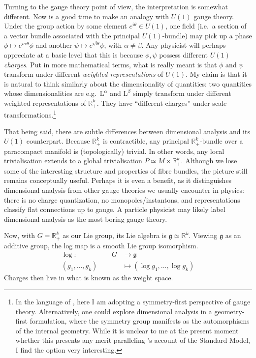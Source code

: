 \documentclass[12pt]{article}
\numberwithin{equation}{section}
\newcommand{\R}{\mathbb{R}}
\begin{document}
\indent Turning to the gauge theory point of view, the interpretation is somewhat different. Now is a good time to make an analogy with $U(1)$ gauge theory. Under the group action by some element $e^{i\theta}\in U(1)$, one field (i.e.~a section of a vector bundle associated with the principal $U(1)$-bundle) may pick up a phase $\phi\mapsto e^{i\alpha\theta}\phi$ and another $\psi\mapsto e^{i\beta\theta}\psi$, with $\alpha\neq \beta$. Any physicist will perhaps appreciate at a basic level that this is because $\phi,\psi$ possess different $U(1)$ \emph{charges}. Put in more mathematical terms, what is really meant is that $\phi$ and $\psi$ transform under different \emph{weighted representations} of $U(1)$. My claim is that it is natural to think similarly about the dimensionality of quantities: two quantities whose dimensionalities are e.g.~$\mathrm{L}^\alpha$ and $\mathrm{L}^\beta$ simply transform under different weighted representations of $\R_+^k$. They have ``different charges'' under scale transformations.\footnote{In the language of \citet{Gomes2024, Gomes2025}, here I am adopting a symmetry-first perspective of gauge theory. Alternatively, one could explore dimensional analysis in a geometry-first formulation, where the symmetry group manifests as the automorphisms of the internal geometry. While it is unclear to me at the present moment whether this presents any merit paralleling \citeauthor{Gomes2024}'s account of the Standard Model, I find the option very interesting.}

That being said, there are subtle differences between dimensional analysis and its $U(1)$ counterpart. Because $\R_+^k$ is contractible, any principal $\R_+^k$-bundle over a paracompact manifold is (topologically) trivial. In other words, any local trivialisation extends to a global trivialisation $P\simeq M\times \R_+^k$. Although we lose some of the interesting structure and properties of fibre bundles, the picture still remains conceptually useful. Perhaps it is even a benefit, as it distinguishes dimensional analysis from other gauge theories we usually encounter in physics: there is no charge quantization, no monopoles/instantons, and representations classify flat connections up to gauge. A particle physicist may likely label dimensional analysis as the most boring gauge theory.

Now, with $G=\R_+^k$ as our Lie group, its Lie algebra is $\mathfrak{g}\simeq \R^k$. Viewing $\mathfrak{g}$ as an additive group, the log map is a smooth Lie group isomorphism.
\begin{equation}
\begin{split}
	\log\colon\qquad \qquad \quad  G & \longrightarrow \mathfrak{g} \\
    (g_1,\dots,g_k) & \longmapsto  (\log g_1,\dots, \log g_k)
\end{split}	
\end{equation}
Charges then live in what is known as the weight space.
\end{document}
